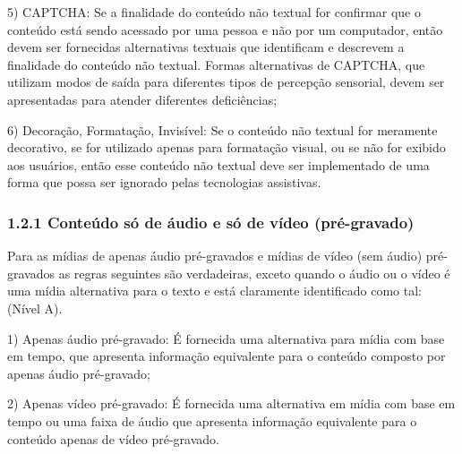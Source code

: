 \documentclass[a4paper]{article}
\begin{document}
\begin{titlepage}
\hspace{.1\textwidth} %
\begin{minipage}{.85\textwidth}
	5) CAPTCHA: Se a finalidade do conteúdo não textual for confirmar que o conteúdo está sendo acessado por uma pessoa e não por um computador, então devem ser fornecidas alternativas textuais que identificam e descrevem a finalidade do conteúdo não textual. Formas alternativas de CAPTCHA, que utilizam modos de saída para diferentes tipos de percepção sensorial, devem ser apresentadas para atender diferentes deficiências;\\
\end{minipage}

\hspace{.1\textwidth} %
\begin{minipage}{.85\textwidth}
	6) Decoração, Formatação, Invisível: Se o conteúdo não textual for meramente decorativo, se for utilizado apenas para formatação visual, ou se não for exibido aos usuários, então esse conteúdo não textual deve ser implementado de uma forma que possa ser ignorado pelas tecnologias assistivas.\\
\end{minipage}

\subsubsection{1.2.1 Conteúdo só de áudio e só de vídeo (pré-gravado)}

Para as mídias de apenas áudio pré-gravados e mídias de vídeo (sem áudio) pré-gravados as regras seguintes são verdadeiras, exceto quando o áudio ou o vídeo é uma mídia alternativa para o texto e está claramente identificado como tal: (Nível A).\\

\hspace{.1\textwidth} %
\begin{minipage}{.85\textwidth}
	1) Apenas áudio pré-gravado: É fornecida uma alternativa para mídia com base em tempo, que apresenta informação equivalente para o conteúdo composto por apenas áudio pré-gravado;\\
\end{minipage}

\hspace{.1\textwidth} %
\begin{minipage}{.85\textwidth}
	2) Apenas vídeo pré-gravado: É fornecida uma alternativa em mídia com base em tempo ou uma faixa de áudio que apresenta informação equivalente para o conteúdo apenas de vídeo pré-gravado.
\end{minipage}

\end{titlepage}
\end{document}
